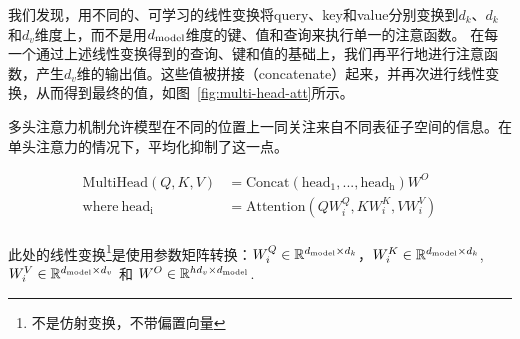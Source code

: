 我们发现，用不同的、可学习的线性变换将query、key和value分别变换到$d_k$、$d_k$和$d_v$维度上，而不是用$d_{\text{model}}$维度的键、值和查询来执行单一的注意函数。
在每一个通过上述线性变换得到的查询、键和值的基础上，我们再平行地进行注意函数，产生$d_v$维的输出值。这些值被拼接（concatenate）起来，并再次进行线性变换，从而得到最终的值，如图~\ref{fig:multi-head-att}所示。

多头注意力机制允许模型在不同的位置上一同关注来自不同表征子空间的信息。在单头注意力的情况下，平均化抑制了这一点。

\begin{align*}
    \mathrm{MultiHead}(Q, K, V) &= \mathrm{Concat}(\mathrm{head_1}, ..., \mathrm{head_h})W^O\\
    \text{where}~\mathrm{head_i} &= \mathrm{Attention}(QW^Q_i, KW^K_i, VW^V_i)\\
\end{align*}

此处的线性变换\footnote{不是仿射变换，不带偏置向量}是使用参数矩阵转换：$W^Q_i \in \mathbb{R}^{d_{\text{model}} \times d_k}$，$W^K_i \in \mathbb{R}^{d_{\text{model}} \times d_k}$, $W^V_i \in \mathbb{R}^{d_{\text{model}} \times d_v}$ 和 $W^O \in \mathbb{R}^{hd_v \times d_{\text{model}}}$.





